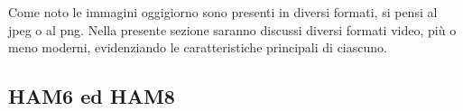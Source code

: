 \documentclass{subfiles}
\begin{document}
Come noto le immagini oggigiorno sono presenti in diversi formati, si pensi al jpeg o al png.
Nella presente sezione saranno discussi diversi formati video, più o meno moderni, evidenziando le caratteristiche principali di ciascuno.

\subsection{HAM6 ed HAM8}

\clearpage

% 
\end{document}
